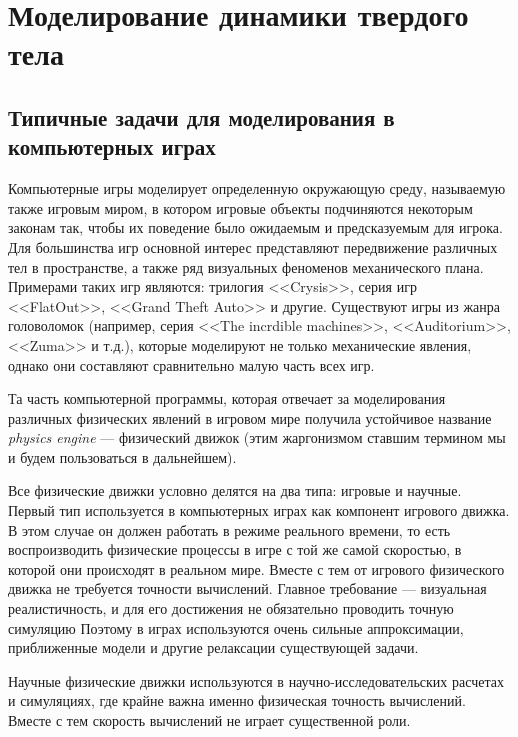 \chapter{Моделирование динамики твердого тела}
\section{Типичные задачи для моделирования в компьютерных играх}

Компьютерные игры моделирует определенную окружающую среду,
называемую также игровым миром, в котором игровые объекты подчиняются
некоторым законам так, чтобы их поведение было ожидаемым и предсказуемым
для игрока. Для большинства игр основной интерес представляют передвижение
различных тел в пространстве, а также ряд визуальных феноменов механического
плана. Примерами таких игр являются: трилогия <<Crysis>>, серия игр <<FlatOut>>, <<Grand Theft Auto>> и другие.
Существуют игры из жанра головоломок (например, серия <<The incrdible machines>>, <<Auditorium>>, <<Zuma>> и т.д.),
которые моделируют не только механические явления, однако они составляют
сравнительно малую часть всех игр.

Та часть компьютерной программы, которая отвечает за моделирования
различных физических явлений в игровом мире получила устойчивое
название \textit{physics engine} --- физический движок (этим жаргонизмом ставшим термином мы и
будем пользоваться в дальнейшем).

Все физические движки условно делятся на два типа: игровые и научные.
Первый тип используется в компьютерных играх как компонент игрового движка. В этом случае он должен
работать в режиме реального времени, то есть воспроизводить физические процессы в игре с той же самой скоростью,
в которой они происходят в реальном мире. Вместе с тем от игрового физического движка не требуется точности вычислений.
Главное требование — визуальная реалистичность, и для его достижения не обязательно проводить точную симуляцию
Поэтому в играх используются очень сильные аппроксимации, приближенные модели и другие релаксации существующей задачи.%

Научные физические движки используются в научно-исследовательских расчетах и симуляциях, где крайне важна
именно физическая точность вычислений. Вместе с тем скорость вычислений не играет существенной роли.

